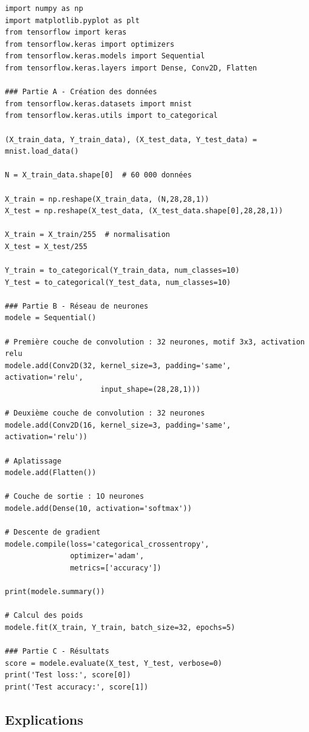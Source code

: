 \documentclass[11pt,class=report,crop=false]{standalone}
\begin{document}
\begin{lstlisting}
import numpy as np
import matplotlib.pyplot as plt
from tensorflow import keras
from tensorflow.keras import optimizers
from tensorflow.keras.models import Sequential
from tensorflow.keras.layers import Dense, Conv2D, Flatten

### Partie A - Création des données
from tensorflow.keras.datasets import mnist
from tensorflow.keras.utils import to_categorical

(X_train_data, Y_train_data), (X_test_data, Y_test_data) = mnist.load_data()

N = X_train_data.shape[0]  # 60 000 données

X_train = np.reshape(X_train_data, (N,28,28,1))
X_test = np.reshape(X_test_data, (X_test_data.shape[0],28,28,1))

X_train = X_train/255  # normalisation
X_test = X_test/255

Y_train = to_categorical(Y_train_data, num_classes=10)
Y_test = to_categorical(Y_test_data, num_classes=10)

### Partie B - Réseau de neurones
modele = Sequential()

# Première couche de convolution : 32 neurones, motif 3x3, activation relu
modele.add(Conv2D(32, kernel_size=3, padding='same', activation='relu',
                      input_shape=(28,28,1)))

# Deuxième couche de convolution : 32 neurones
modele.add(Conv2D(16, kernel_size=3, padding='same', activation='relu'))

# Aplatissage 
modele.add(Flatten())

# Couche de sortie : 1O neurones
modele.add(Dense(10, activation='softmax'))

# Descente de gradient
modele.compile(loss='categorical_crossentropy',
               optimizer='adam',
               metrics=['accuracy'])

print(modele.summary())

# Calcul des poids
modele.fit(X_train, Y_train, batch_size=32, epochs=5)

### Partie C - Résultats
score = modele.evaluate(X_test, Y_test, verbose=0)
print('Test loss:', score[0])
print('Test accuracy:', score[1])
\end{lstlisting}


\subsection{Explications}
\end{document}
